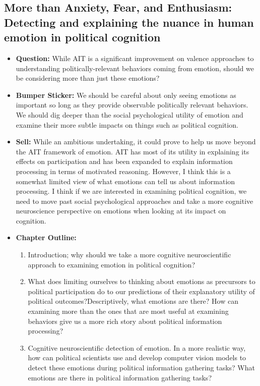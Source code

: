 \documentclass[12pt]{article}
\begin{document}
\subsection{More than Anxiety, Fear, and Enthusiasm: Detecting and explaining the nuance in human emotion in political cognition}
    \begin{itemize}
        \item \textbf{Question:} While AIT is a significant improvement on valence approaches to understanding politically-relevant behaviors coming from emotion, should we be considering more than just these emotions?
        \item \textbf{Bumper Sticker:} We should be careful about only seeing emotions as important so long as they provide observable politically relevant behaviors. We should dig deeper than the social psychological utility of emotion and examine their more subtle impacts on things such as political cognition.
        \item \textbf{Sell:} While an ambitious undertaking, it could prove to help us move beyond the AIT framework of emotion. AIT has most of its utility in explaining its effects on participation and has been expanded to explain information processing in terms of motivated reasoning. However, I think this is a somewhat limited view of what emotions can tell us about information processing. I think if we are interested in examining political cognition, we need to move past social psychological approaches and take a more cognitive neuroscience perspective on emotions when looking at its impact on cognition.
        \item \textbf{Chapter Outline:}
        \begin{enumerate}
            \item Introduction; why should we take a more cognitive neuroscientific approach to examining emotion in political cognition?
            \item What does limiting ourselves to thinking about emotions as precursors to political participation do to our predictions of their explanatory utility of political outcomes?Descriptively, what emotions are there? How can examining more than the ones that are most useful at examining behaviors give us a more rich story about political information processing?
            \item Cognitive neuroscientific detection of emotion. In a more realistic way, how can political scientists use and develop computer vision models to detect these emotions during political information gathering tasks? What emotions are there in political information gathering tasks?

\end{enumerate}
\end{itemize}
\end{document}

